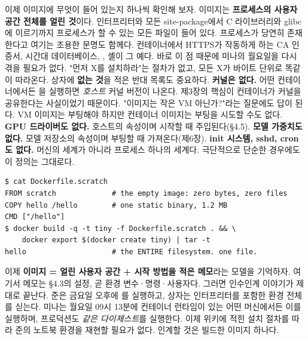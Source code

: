 이제 이미지에 무엇이 들어 있는지 하나씩 확인해 보자. 이미지는 \textbf{프로세스의 사용자 공간 전체를 얼린 것}이다. 인터프리터와 모든 site-package에서 C 라이브러리와 glibc에 이르기까지 프로세스가 할 수 있는 모든 파일이 들어 있다. 프로세스가 당연히 존재한다고 여기는 조용한 문명도 함께다. 컨테이너에서 HTTPS가 작동하게 하는 CA 인증서, 시간대 데이터베이스, , 셸이 그 예다. 바로 이 점 때문에 미나의 월요일을 다시 겪을 필요가 없다. "먼저 X를 설치하라"는 절차가 없고, 모든 X가 바이트 단위로 똑같이 따라온다. 상자에 \textbf{없는 것}을 적은 반대 목록도 중요하다. \textbf{커널은 없다.} 어떤 컨테이너에서든 을 실행하면 \textit{호스트} 커널 버전이 나온다. 제3장의 핵심이 컨테이너가 커널을 공유한다는 사실이었기 때문이다. "이미지는 작은 VM 아닌가?"라는 질문에도 답이 된다. VM 이미지는 부팅해야 하지만 컨테이너 이미지는 부팅을 시도할 수도 없다. \textbf{GPU 드라이버도 없다.} 호스트의 속성이며 시작할 때 주입된다(§4.5). \textbf{모델 가중치도 없다.} 모델 저장소의 속성이며 부팅할 때 가져온다(제6장). \textbf{init 시스템, sshd, cron도 없다.} 머신의 세계가 아니라 프로세스 하나의 세계다. 극단적으로 단순한 경우에도 이 정의는 그대로다.

\begin{terminalbox}
\begin{Verbatim}[breaklines=true,breakanywhere=true,fontsize=\small,formatcom=\color{tbbtermfg},codes=\tbbcodeactive]
$ cat Dockerfile.scratch
FROM scratch             # the empty image: zero bytes, zero files
COPY hello /hello        # one static binary, 1.2 MB
CMD ["/hello"]
$ docker build -q -t tiny -f Dockerfile.scratch . && \
    docker export $(docker create tiny) | tar -t
hello                    # the ENTIRE filesystem. one file.
\end{Verbatim}
\end{terminalbox}

이제 \textbf{이미지 = 얼린 사용자 공간 + 시작 방법을 적은 메모}라는 모델을 기억하자. 여기서 메모는 §4.3의 설정, 곧 환경 변수·명령·사용자다. 그러면 인수인계 이야기가 제대로 끝난다. 준은 금요일 오후에 를 실행하고, 상자는 인터프리터를 포함한 환경 전체를 싣는다. 미나는 월요일 09시 13분에 컨테이너 런타임이 있는 어떤 머신에서든 이를 실행하며, 프로덕션도 \textit{같은 다이제스트}를 실행한다. 이제 위키에 적힌 설치 절차를 따라 준의 노트북 환경을 재현할 필요가 없다. 인계할 것은 빌드한 이미지 하나다.


